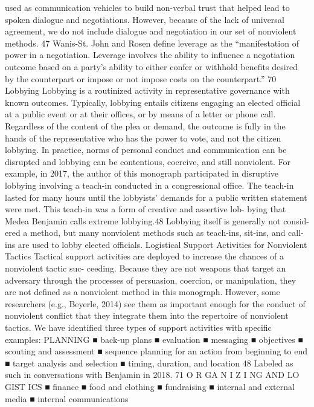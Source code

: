 \documentclass[twoside,a4paper,12pt,fleqn,openany]{extbook}
\begin{document}
used as communication vehicles to build non-verbal trust that helped lead to spoken dialogue
and negotiations.
However, because of the lack of universal agreement, we do not include dialogue and
negotiation in our set of nonviolent methods.
47
Wanis-St. John and Rosen define leverage as the “manifestation of power in a negotiation. Leverage involves the
ability to influence a negotiation outcome based on a party’s ability to either confer or withhold benefits desired
by the counterpart or impose or not impose costs on the counterpart.”
70
Lobbying
Lobbying is a routinized activity in representative governance with known outcomes. Typically,
lobbying entails citizens engaging an elected official at a public event or at their offices, or
by means of a letter or phone call. Regardless of the content of the plea or demand, the
outcome is fully in the hands of the representative who has the power to vote, and not the
citizen lobbying. In practice, norms of personal conduct and communication can be disrupted
and lobbying can be contentious, coercive, and still nonviolent. For example, in 2017, the
author of this monograph participated in disruptive lobbying involving a teach-in conducted
in a congressional office. The teach-in lasted for many hours until the lobbyists’ demands for
a public written statement were met. This teach-in was a form of creative and assertive lob-
bying that Medea Benjamin calls extreme lobbying.48 Lobbying itself is generally not consid-
ered a method, but many nonviolent methods such as teach-ins, sit-ins, and call-ins are used
to lobby elected officials.
Logistical Support Activities for Nonviolent Tactics
Tactical support activities are deployed to increase the chances of a nonviolent tactic suc-
ceeding. Because they are not weapons that target an adversary through the processes of
persuasion, coercion, or manipulation, they are not defined as a nonviolent method in this
monograph. However, some researchers (e.g., Beyerle, 2014) see them as important enough
for the conduct of nonviolent conflict that they integrate them into the repertoire of nonviolent
tactics. We have identified three types of support activities with specific examples:
PLANNING
■
 back-up plans
■
 evaluation
■
 messaging
■
 objectives
■
 scouting and assessment
■
 sequence planning for an action from beginning to end
■
 target analysis and selection
■
 timing, duration, and location
48
Labeled as such in conversations with Benjamin in 2018.
71
O R GA N I Z I NG AND LO GIST ICS
■
 finance
■
 food and clothing
■
 fundraising
■
 internal and external media
■
 internal communications
\end{document}
